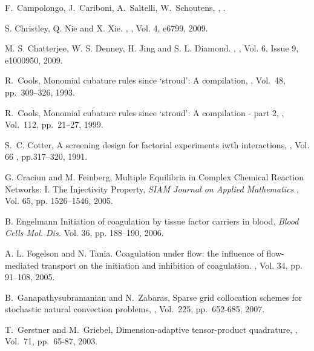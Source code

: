 \begin{thebibliography}{99}
\newblock F.~Campolongo, J.~Cariboni, A.~Saltelli, W.~Schoutens, , .


\newblock S. Christley, Q. Nie and X. Xie. , ,
Vol. 4, e6799, 2009.

\newblock M. S. Chatterjee, W. S. Denney, H. Jing and S. L. Diamond.
,
, Vol. 6, Issue 9, e1000950, 2009.

\newblock R.~Cools, \newblock Monomial cubature rules since `stroud': A compilation, , Vol.~48, pp.~309--326, 1993.

\newblock R.~Cools, \newblock Monomial cubature rules since `stroud': A compilation - part
2,
, Vol.~112, pp.~21--27, 1999.


\newblock S.~C. Cotter, \newblock A screening design for factorial experiments iwth interactions,
, Vol. 66 , pp.317--320, 1991.

 G. Craciun and M. Feinberg, \newblock Multiple Equilibria in Complex Chemical Reaction Networks: I. The Injectivity Property, {\em SIAM Journal on  Applied Mathematics }, Vol. 65, pp.
1526--1546, 2005.

\newblock B. Engelmann  \newblock Initiation of coagulation by tissue factor
carriers in blood. {\em Blood Cells Mol. Dis. } Vol. 36, pp.
188--190, 2006.

A. L. Fogelson and N. Tania.
\newblock Coagulation under flow: the influence of flow-mediated transport on the initiation and inhibition of coagulation.
, Vol. 34, pp. 91--108, 2005.


\newblock B.~Ganapathysubramanian and N.~Zabaras, \newblock Sparse grid collocation schemes for
\newblock  stochastic natural convection problems, , Vol.~225, pp.~652-685, 2007.

\newblock T.~Gerstner and M.~Griebel, \newblock Dimension-adaptive tensor-product
quadrature,
 , Vol.~71, pp.~65-87, 2003.



\end{thebibliography}
